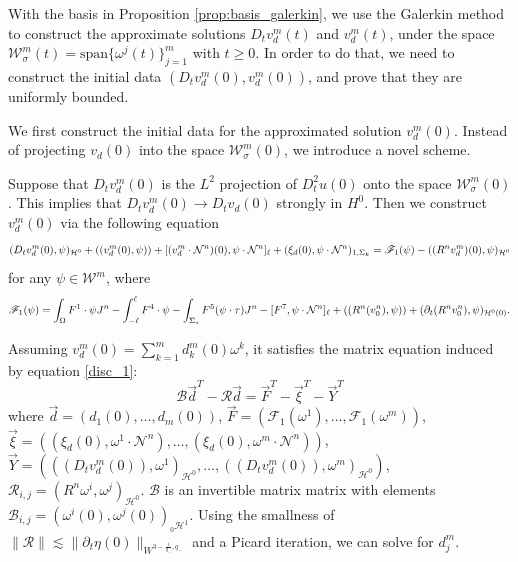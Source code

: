 \documentclass[letterpaper,reqno,10pt,twoside]{amsart}
\theoremstyle{definition}
\theoremstyle{remark}
\def\p{\partial}
\begin{document}
	With the basis in Proposition \ref{prop:basis_galerkin}, we use the Galerkin method to construct the approximate solutions $D_tv_{d}^m(t)$ and $v_{d}^{m}(t)$, under the space $\mathcal{W}_{\sigma}^m(t)=\text{span}\{\omega^j(t)\}_{j=1}^m$ with $t\ge0$. In order to do that, we need to construct the initial data $(D_tv_{d}^m(0),v_{d}^{m}(0))$, and prove that they are uniformly bounded.
	
	We first construct the initial data for the approximated solution $v_{d}^m(0)$. Instead of projecting $v_{d}(0)$ into the space $\mathcal{W}_{\sigma}^{m}(0)$, we introduce a novel scheme. 
	
	Suppose that $D_{t}v_{d}^{m}(0)$ is the $L^{2}$ projection of $D_{t}^{2}u(0)$ onto the space $\mathcal{W}_{\sigma}^{m}(0)$. This implies that $D_{t}v_{d}^{m}(0)\rightarrow D_{t}v_{d}(0)$ strongly in $H^{0}$. 
	Then we construct $v_{d}^{m}(0)$ via the following equation
	\begin{align}{\label{disc_1}}
		\begin{aligned}
			(D_{t}v_{d}^{m}(0),\psi)_{\mathcal{H}^{0}}+((v_{d}^m(0),\psi))
			+[(v_{d}^{m}\cdot \mathcal{N}^{n})(0),\psi\cdot\mathcal{N}^{n}]_\ell
			+(\xi_{d}(0),\psi\cdot\mathcal{N}^{n})_{1,\Sigma_{k}}=\mathscr{F}_1(\psi)-((R^{n}v_{d}^{m})(0),\psi)_{\mathcal{H}^{0}}
		\end{aligned}
	\end{align}
	for any $\psi\in \mathcal{W}^{m}$, where
	\begin{align}{\label{def:F_1}}
		\begin{aligned}
			\mathscr{F}_1(\psi)=\int_{\Omega}F^{1}\cdot \psi J^{n}-\int_{-\ell}^{\ell}F^{4}\cdot \psi-\int_{\Sigma_{s}}F^{5}(\psi\cdot \tau)J^{n}-[F^{7},\psi\cdot \mathcal{N}^{n}]_{\ell}+((R^{n}(v_{0}^{n}),\psi))+(\p_{t}(R^{n}v_{0}^{n}),\psi)_{\mathcal{H}^{0}(0)}.
		\end{aligned}
	\end{align}
	
	Assuming $v_{d}^{m}(0)=\sum_{k=1}^{m}d_{k}^{m}(0)\omega^{k}$, it satisfies the matrix equation induced by equation \eqref{disc_1}:
	\[
	\mathcal{B}\vec{d}^T-\mathscr{R}\vec{d}=\vec{F}^T-\vec{\xi}^T-\vec{Y}^T
	\]
	\noindent where $\vec{d}=(d_1(0),\ldots,d_{m}(0))$, $\vec{F}=(\mathscr{F}_{1}(\omega^{1}),\ldots,\mathscr{F}_{1}(\omega^{m}))$,$\vec{\xi}=((\xi_{d}(0),\omega^{1}\cdot \mathcal{N}^{n}),\ldots,(\xi_{d}(0),\omega^{m}\cdot \mathcal{N}^{n}))$, $\vec{Y}=(((D_{t}v_{d}^{m}(0)),\omega^{1})_{\mathcal{H}^{0}},\ldots,((D_{t}v_{d}^{m}(0)),\omega^{m})_{\mathcal{H}^{0}})$, $\mathscr{R}_{i,j}=(R^{n}\omega^{i},\omega^{j})_{\mathcal{H}^{0}}$. $\mathcal{B}$ is an invertible matrix matrix with elements $\mathcal{B}_{i,j}=(\omega^{i}(0),\omega^{j}(0))_{{}_{0}\mathcal{H}^{1}}$. Using the smallness of $\|\mathscr{R}\|\lesssim \|\p_{t}\eta(0)\|_{W^{3-\frac{1}{q_{-}},q_{-}}}$ and a Picard iteration, we can solve for $d_{j}^{m}$.
	
\end{document}
